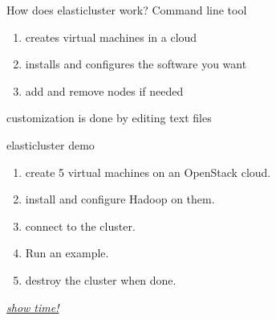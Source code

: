 \documentclass[english,serif,mathserif,usenames,dvipsnames]{beamer}
\begin{document}
\begin{frame}
  {How does elasticluster work?}
  Command line tool
\+
  \begin{enumerate}
  \item creates virtual machines in a cloud
  \item {\color{Blue}installs and configures} the software you want
  \item add and remove nodes if needed
  \end{enumerate}
\+

  customization is done by editing text files
\end{frame}

\begin{frame}
  {elasticluster demo}

  \begin{enumerate}
  \item create 5 virtual machines on an OpenStack cloud.
  \item install and configure Hadoop on them.
  \item connect to the cluster.
  \item Run an example.
  \item destroy the cluster when done.
  \end{enumerate}
  \pause
  \begin{center}
    \href{http://youtu.be/-Z4FaXEivVo}{\textit{show time!}}
  \end{center}
\end{frame}


\end{document}
